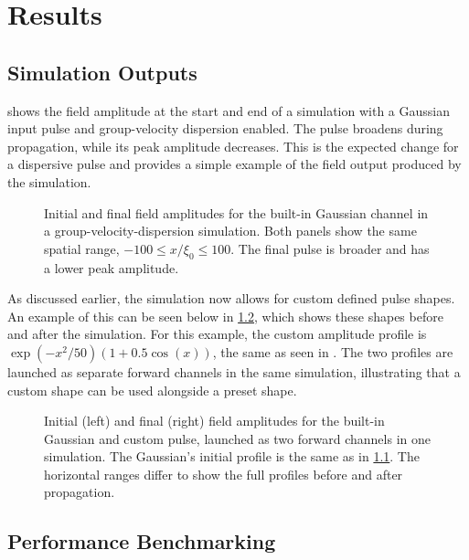 \chapter{Results}

\section{Simulation Outputs}

 shows the field amplitude at the start and end of a
simulation with a Gaussian input pulse and group-velocity dispersion enabled. The pulse
broadens during propagation, while its peak amplitude decreases. This is the expected change
for a dispersive pulse and provides a simple example of the field output produced by the
simulation.

\begin{figure}
  \centering
  \caption{Initial and final field amplitudes for the built-in Gaussian channel in a
  group-velocity-dispersion simulation. Both panels show the same spatial range,
  $-100 \leq x/\xi_0 \leq 100$. The final pulse is broader and has a lower peak amplitude.}
  \label{fig:simulation-gaussian-evolution}
\end{figure}

As discussed earlier, the simulation now allows for custom defined pulse shapes. An example
of this can be seen below in \cref{fig:simulation-builtin-custom}, which shows these shapes before and after 
the simulation. For this example, the custom amplitude profile is
\(\exp(-x^2/50)(1 + 0.5\cos(x))\), the same as seen in .
The two profiles are launched as separate forward channels in the same simulation,
illustrating that a custom shape can be used alongside a preset shape.

\begin{figure}
  \centering
  \caption{Initial (left) and final (right) field amplitudes for the built-in Gaussian and
  custom pulse, launched as two forward channels in one simulation. The Gaussian's initial
  profile is the same as in \cref{fig:simulation-gaussian-evolution}. The horizontal ranges
  differ to show the full profiles before and after propagation.}
  \label{fig:simulation-builtin-custom}
\end{figure}

\section{Performance Benchmarking}

